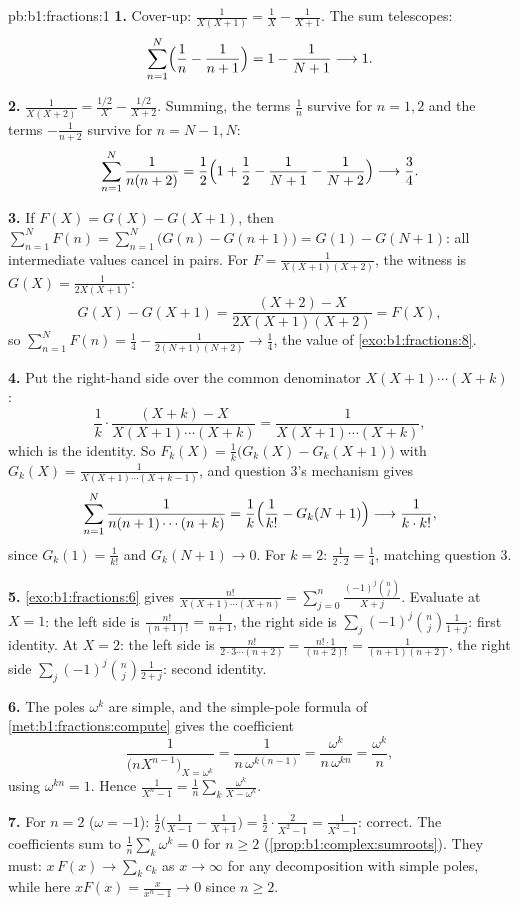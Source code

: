 \begin{solution}{pb:b1:fractions:1}
\textbf{1.} Cover-up: $\frac1{X(X+1)} = \frac1X - \frac1{X+1}$.
The sum telescopes:
\[
\sum_{n=1}^{N}\Bigl(\frac1n - \frac1{n+1}\Bigr)
= 1 - \frac1{N+1} \longrightarrow 1 .
\]

\textbf{2.} $\frac1{X(X+2)} = \frac{1/2}X - \frac{1/2}{X+2}$.
Summing, the terms $\frac1n$ survive for $n = 1, 2$ and the terms
$-\frac1{n+2}$ survive for $n = N-1, N$:
\[
\sum_{n=1}^{N}\frac1{n(n+2)}
= \frac12\Bigl(1 + \frac12 - \frac1{N+1} - \frac1{N+2}\Bigr)
\longrightarrow \frac34 .
\]

\textbf{3.} If $F(X) = G(X) - G(X+1)$, then $\sum_{n=1}^N F(n) =
\sum_{n=1}^N\bigl(G(n) - G(n+1)\bigr) = G(1) - G(N+1)$: all
intermediate values cancel in pairs. For $F =
\frac1{X(X+1)(X+2)}$, the witness is $G(X) = \frac1{2X(X+1)}$:
\[
G(X) - G(X+1)
= \frac{(X+2) - X}{2X(X+1)(X+2)} = F(X) ,
\]
so $\sum_{n=1}^N F(n) = \frac14 - \frac1{2(N+1)(N+2)} \to
\frac14$, the value of \cref{exo:b1:fractions:8}.

\textbf{4.} Put the right-hand side over the common denominator
$X(X+1)\cdots(X+k)$:
\[
\frac1k\cdot\frac{(X + k) - X}{X(X+1)\cdots(X+k)}
= \frac{1}{X(X+1)\cdots(X+k)} ,
\]
which is the identity. So $F_k(X) = \frac1k\bigl(G_k(X) -
G_k(X+1)\bigr)$ with $G_k(X) = \frac1{X(X+1)\cdots(X+k-1)}$, and
question 3's mechanism gives
\[
\sum_{n=1}^{N}\frac1{n(n+1)\cdots(n+k)}
= \frac1k\Bigl(\frac1{k!} - G_k(N+1)\Bigr)
\longrightarrow \frac1{k\cdot k!} ,
\]
since $G_k(1) = \frac1{k!}$ and $G_k(N+1) \to 0$. For $k = 2$:
$\frac1{2\cdot2} = \frac14$, matching question 3.

\textbf{5.} \cref{exo:b1:fractions:6} gives
$\frac{n!}{X(X+1)\cdots(X+n)} = \sum_{j=0}^n
\frac{(-1)^j\binom nj}{X + j}$. Evaluate at $X = 1$: the left side
is $\frac{n!}{(n+1)!} = \frac1{n+1}$, the right side is
$\sum_j(-1)^j\binom nj\frac1{1+j}$: first identity. At $X = 2$:
the left side is $\frac{n!}{2\cdot3\cdots(n+2)} =
\frac{n!\cdot1}{(n+2)!} = \frac1{(n+1)(n+2)}$, the right side
$\sum_j(-1)^j\binom nj\frac1{2+j}$: second identity.

\textbf{6.} The poles $\omega^k$ are simple, and the simple-pole
formula of \cref{met:b1:fractions:compute} gives the coefficient
\[
\frac{1}{\bigl(nX^{n-1}\bigr)_{X = \omega^k}}
= \frac{1}{n\,\omega^{k(n-1)}}
= \frac{\omega^k}{n\,\omega^{kn}} = \frac{\omega^k}n ,
\]
using $\omega^{kn} = 1$. Hence $\frac1{X^n-1} = \frac1n\sum_k
\frac{\omega^k}{X - \omega^k}$.

\textbf{7.} For $n = 2$ ($\omega = -1$): $\frac12\bigl(
\frac1{X-1} - \frac1{X+1}\bigr) = \frac12\cdot\frac{2}{X^2-1} =
\frac1{X^2-1}$: correct. The coefficients sum to
$\frac1n\sum_k\omega^k = 0$ for $n \geq 2$
(\cref{prop:b1:complex:sumroots}). They must: $x\,F(x) \to
\sum_k c_k$ as $x \to \infty$ for any decomposition with simple
poles, while here $xF(x) = \frac{x}{x^n-1} \to 0$ since $n \geq
2$.


\end{solution}
